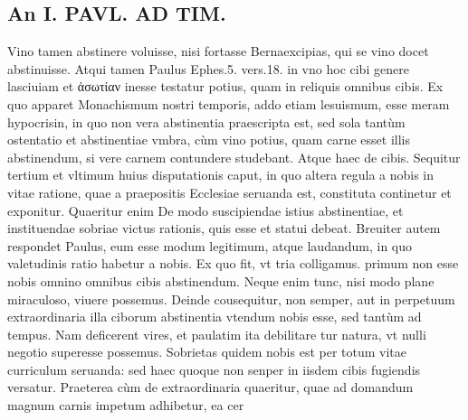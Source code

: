 \documentclass{article}
\begin{document}
\begin{pages}
\section*{An I. PAVL. AD TIM. }
\marginpar{[ p.Joo ]}\pstart Vino tamen abstinere voluisse, nisi fortasse Bernaexcipias, qui se vino docet abstinuisse. Atqui tamen Paulus Ephes.5. vers.18. in vno hoc cibi genere lasciuiam et ἀσωτίαν inesse testatur potius, quam in reliquis omnibus cibis. Ex quo apparet Monachismum nostri temporis, addo etiam lesuismum, esse meram hypocrisin, in quo non vera abstinentia praescripta est, sed sola tantùm ostentatio et abstinentiae vmbra, cùm vino potius, quam carne esset illis abstinendum, si vere carnem contundere studebant. Atque haec de cibis.  \pend\pstart Sequitur tertium et vltimum huius disputationis caput, in quo altera regula a nobis in vitae ratione, quae a praepositis Ecclesiae seruanda est, constituta continetur et exponitur. Quaeritur enim De modo suscipiendae istius abstinentiae, et instituendae sobriae victus rationis, quis esse et statui debeat. Breuiter autem respondet Paulus, eum esse modum legitimum, atque laudandum, in quo valetudinis ratio habetur a nobis. Ex quo fit, vt tria colligamus. primum non esse nobis omnino omnibus cibis abstinendum. Neque enim tunc, nisi modo plane miraculoso, viuere possemus. Deinde cousequitur, non semper, aut in perpetuum extraordinaria illa ciborum abstinentia vtendum nobis esse, sed tantùm ad tempus. Nam deficerent vires, et paulatim ita debilitare tur natura, vt nulli negotio superesse possemus. Sobrietas quidem nobis est per totum vitae curriculum seruanda: sed haec quoque non senper in iisdem cibis fugiendis versatur. Praeterea cùm de extraordinaria quaeritur, quae ad domandum magnum carnis impetum adhibetur, ea cer\pend

\end{pages}
\end{document}
